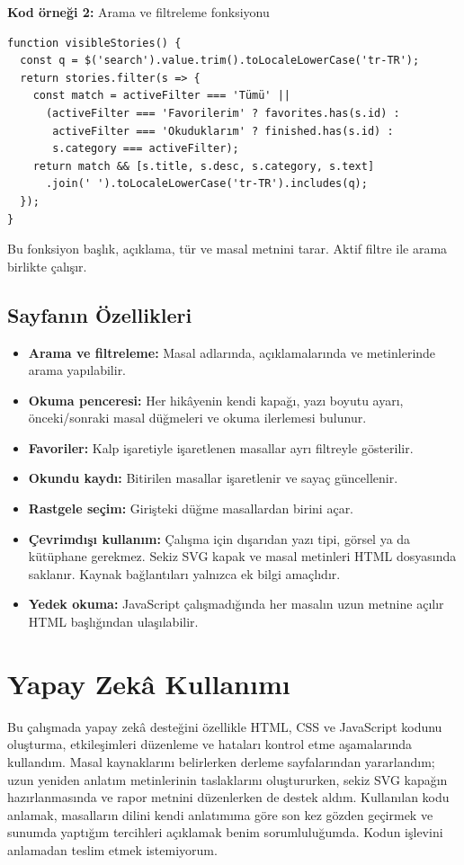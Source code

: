 \documentclass[12pt,a4paper]{article}
\begin{document}
\noindent\textbf{Kod örneği 2:} Arama ve filtreleme fonksiyonu\par
\begin{Verbatim}[frame=single,fontsize=\small]
function visibleStories() {
  const q = $('search').value.trim().toLocaleLowerCase('tr-TR');
  return stories.filter(s => {
    const match = activeFilter === 'Tümü' ||
      (activeFilter === 'Favorilerim' ? favorites.has(s.id) :
       activeFilter === 'Okuduklarım' ? finished.has(s.id) :
       s.category === activeFilter);
    return match && [s.title, s.desc, s.category, s.text]
      .join(' ').toLocaleLowerCase('tr-TR').includes(q);
  });
}
\end{Verbatim}
Bu fonksiyon başlık, açıklama, tür ve masal metnini tarar. Aktif filtre ile arama birlikte çalışır.

\subsection{Sayfanın Özellikleri}
\begin{itemize}
\item \textbf{Arama ve filtreleme:} Masal adlarında, açıklamalarında ve metinlerinde arama yapılabilir.
\item \textbf{Okuma penceresi:} Her hikâyenin kendi kapağı, yazı boyutu ayarı, önceki/sonraki masal düğmeleri ve okuma ilerlemesi bulunur.
\item \textbf{Favoriler:} Kalp işaretiyle işaretlenen masallar ayrı filtreyle gösterilir.
\item \textbf{Okundu kaydı:} Bitirilen masallar işaretlenir ve sayaç güncellenir.
\item \textbf{Rastgele seçim:} Girişteki düğme masallardan birini açar.
\item \textbf{Çevrimdışı kullanım:} Çalışma için dışarıdan yazı tipi, görsel ya da kütüphane gerekmez. Sekiz SVG kapak ve masal metinleri HTML dosyasında saklanır. Kaynak bağlantıları yalnızca ek bilgi amaçlıdır.
\item \textbf{Yedek okuma:} JavaScript çalışmadığında her masalın uzun metnine açılır HTML başlığından ulaşılabilir.
\end{itemize}

\section{Yapay Zekâ Kullanımı}
Bu çalışmada yapay zekâ desteğini özellikle HTML, CSS ve JavaScript kodunu oluşturma, etkileşimleri düzenleme ve hataları kontrol etme aşamalarında kullandım. Masal kaynaklarını belirlerken derleme sayfalarından yararlandım; uzun yeniden anlatım metinlerinin taslaklarını oluştururken, sekiz SVG kapağın hazırlanmasında ve rapor metnini düzenlerken de destek aldım. Kullanılan kodu anlamak, masalların dilini kendi anlatımıma göre son kez gözden geçirmek ve sunumda yaptığım tercihleri açıklamak benim sorumluluğumda. Kodun işlevini anlamadan teslim etmek istemiyorum.
\end{document}
